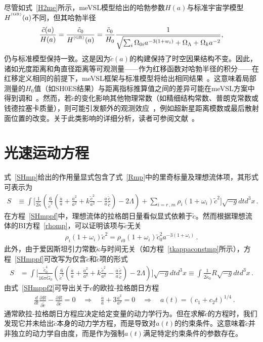 \documentclass[jkps,preprint,fleqn]{revtex4}
\newcommand{\tc}{\tilde{c}}
\newcommand{\tG}{\tilde{G}}
\newcommand{\GR}{\text{GR}}
\newcommand{\tkapp}{\tilde{\kappa}}
\begin{document}
\begin{CJK*}{UTF8}{gbsn}
尽管如式~\eqref{H2me}所示，meVSL模型给出的哈勃参数$H(a)$与标准宇宙学模型$H^{\textsuperscript{\tiny (\GR)}}(a)$不同，但其哈勃半径
\begin{equation}
    \frac{\tilde{c}(a)}{H(a)}  = \frac{\tc_0}{H^{\textsuperscript{\tiny (\GR)}}(a)} = \frac{\tilde{c}_0}{H_0} \frac{1}{\sqrt{\sum_i \Omega_{0i} a^{-3(1+w_i)} + \Omega_\Lambda + \Omega_k a^{-2}}},
\end{equation}
仍与标准模型保持一致。这是因为$\tilde{c}(a)$的构建保持了时空因果结构不变。因此，诸如光度距离和角直径距离等可观测量——作为红移函数对哈勃半径的积分——在红移定义相同的前提下，meVSL框架与标准模型将给出相同结果~\cite{Lee:2020zts}。这意味着局部测量的$H_0$值（如SH0ES结果）与距离指标推算值之间的差异可能在meVSL方案中得到调和~\cite{Lee:2024nya}。然而，若$\tilde{c}$的变化影响其他物理常数（如精细结构常数、普朗克常数或钱德拉塞卡质量），则可能引发额外的观测效应~\cite{Lee:2020zts,Lee:2021xwh}，例如超新星距离模数或最后散射面位置的改变。关于此类影响的详细分析，读者可参阅文献~\cite{Lee:2020zts}。
\section{光速运动方程}
\label{sec:sol}

式~\eqref{SHmp}给出的作用量显式包含了式~\eqref{Rmp}中的里奇标量及理想流体项，其形式可表示为
\begin{align}
S &\equiv \int \Biggl[ \frac{1}{2 \tkapp} \left( \frac{6}{\tc^2} \left( \frac{\ddot{a}}{a} + \frac{\dot{a}^2}{a^2} + k \frac{\tc^2}{a^2} - \frac{\dot{a}}{a} \frac{\dot{\tc}}{ \tc} \right)  - 2 \Lambda \right) + \sum_{i=r\,,m} \rho_i (1 + \omega_i ) \tc^2 \Biggr] \sqrt{-g} dt d^3x \label{SHmppf} \,.
\end{align}
在方程~\eqref{SHmppf}中，理想流体的拉格朗日量看似显式依赖于$\tc$。然而根据理想流体的BI方程~\eqref{rhomp}，可以证明该项与$\tc$无关
\begin{align}
 \rho_i (1 + \omega_i ) \tc^2 =  \rho_{i0} (1 + \omega_i ) \tc_{0}^2 a^{-3(1 + \omega_i )}  \label{rhoi} \,.
\end{align}
此外，由于爱因斯坦引力常数$\tkapp$与时间无关（如方程~\eqref{tkappaconstmp}所示），方程~\eqref{SHmppf}可改写为仅含$\tc$和$\dot{\tc}$项的形式
\begin{align}
S &= \int \Biggl[ \frac{\tc_0^4}{16 \pi \tG_0} \left( \frac{6}{\tc^2} \left( \frac{\ddot{a}}{a} + \frac{\dot{a}^2}{a^2} + k \frac{\tc^2}{a^2} - \frac{\dot{a}}{a} \frac{\dot{\tc}}{ \tc} \right)  - 2 \Lambda \right)  \Biggr] \sqrt{-g} dt d^3x \equiv \int \frac{1}{2 \tkapp_0} R \sqrt{-g} dt d^3x \label{SHmppf2} \,.
\end{align}
由式~\eqref{SHmppf2}可导出关于$c$的欧拉-拉格朗日方程
\begin{align}
& \frac{d}{dt} \frac{\partial R}{\partial \dot{\tc}} - \frac{\partial R}{\partial \tc} = 0 \quad \Rightarrow \quad \frac{\ddot{a}}{a} + 3 \frac{\dot{a}^2}{a^2} = 0 \quad \Rightarrow \quad a(t) = (c_1 + c_2 t)^{1/4} \label{eomtc} \,.
\end{align}
通常欧拉-拉格朗日方程应决定给定变量的动力学行为。但在求解$\tc$的方程时，我们发现它并未给出$\tc$本身的动力学方程，而是导致对$a(t)$的约束条件。这意味着$\tc$并非独立的动力学自由度，而是作为强制$a(t)$满足特定约束条件的参数存在。


\end{CJK*}
\end{document}

